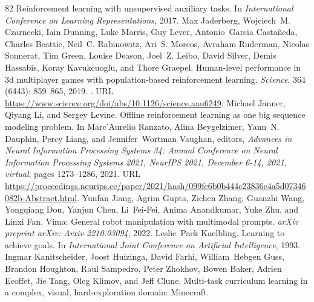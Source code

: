 \documentclass{article}
\begin{document}
\begin{thebibliography}{82}
\newblock Reinforcement learning with unsupervised auxiliary tasks.
\newblock In \emph{International Conference on Learning Representations}, 2017.
Max Jaderberg, Wojciech~M. Czarnecki, Iain Dunning, Luke Marris, Guy Lever, Antonio~Garcia Castañeda, Charles Beattie, Neil~C. Rabinowitz, Ari~S. Morcos, Avraham Ruderman, Nicolas Sonnerat, Tim Green, Louise Deason, Joel~Z. Leibo, David Silver, Demis Hassabis, Koray Kavukcuoglu, and Thore Graepel.
\newblock Human-level performance in 3d multiplayer games with population-based reinforcement learning.
\newblock \emph{Science}, 364 (6443): 859--865, 2019.
\newblock {}.
\newblock URL \url{https://www.science.org/doi/abs/10.1126/science.aau6249}.
Michael Janner, Qiyang Li, and Sergey Levine.
\newblock Offline reinforcement learning as one big sequence modeling problem.
\newblock In Marc'Aurelio Ranzato, Alina Beygelzimer, Yann~N. Dauphin, Percy Liang, and Jennifer~Wortman Vaughan, editors, \emph{Advances in Neural Information Processing Systems 34: Annual Conference on Neural Information Processing Systems 2021, NeurIPS 2021, December 6-14, 2021, virtual}, pages 1273--1286, 2021.
\newblock URL \url{https://proceedings.neurips.cc/paper/2021/hash/099fe6b0b444c23836c4a5d07346082b-Abstract.html}.
Yunfan Jiang, Agrim Gupta, Zichen Zhang, Guanzhi Wang, Yongqiang Dou, Yanjun Chen, Li~Fei-Fei, Anima Anandkumar, Yuke Zhu, and Linxi Fan.
\newblock Vima: General robot manipulation with multimodal prompts.
\newblock \emph{arXiv preprint arXiv: Arxiv-2210.03094}, 2022.
Leslie~Pack Kaelbling.
\newblock Learning to achieve goals.
\newblock In \emph{International Joint Conference on Artificial Intelligence}, 1993.
Ingmar Kanitscheider, Joost Huizinga, David Farhi, William~Hebgen Guss, Brandon Houghton, Raul Sampedro, Peter Zhokhov, Bowen Baker, Adrien Ecoffet, Jie Tang, Oleg Klimov, and Jeff Clune.
\newblock Multi-task curriculum learning in a complex, visual, hard-exploration domain: Minecraft.

\end{thebibliography}
\end{document}
